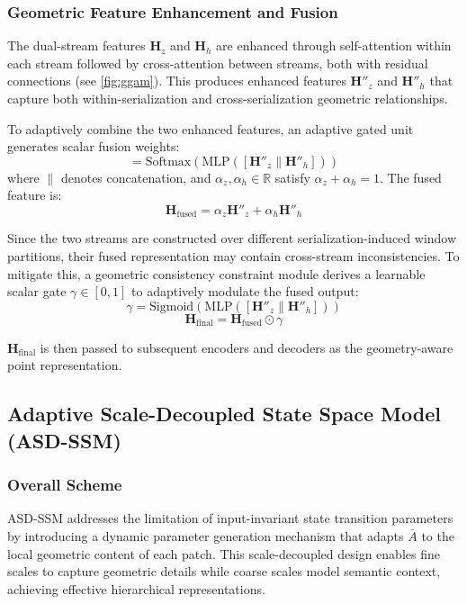 \documentclass[a4paper,fleqn]{cas-sc}
\begin{document}
\subsubsection{Geometric Feature Enhancement and Fusion}

The dual-stream features $\mathbf{H}_z$ and $\mathbf{H}_h$ are enhanced through self-attention within each stream followed by cross-attention between streams, both with residual connections (see \cref{fig:ggam}). This produces enhanced features $\mathbf{H}''_z$ and $\mathbf{H}''_h$ that capture both within-serialization and cross-serialization geometric relationships.

To adaptively combine the two enhanced features, an adaptive gated unit generates scalar fusion weights:
\begin{equation}
	[\alpha_z, \alpha_h] = \text{Softmax}(\text{MLP}([\mathbf{H}''_z \| \mathbf{H}''_h]))
\end{equation}
where $\|$ denotes concatenation, and $\alpha_z, \alpha_h \in \mathbb{R}$ satisfy $\alpha_z + \alpha_h = 1$. The fused feature is:
\begin{equation}
	\mathbf{H}_{\text{fused}} = \alpha_z \mathbf{H}''_z + \alpha_h \mathbf{H}''_h
\end{equation}

Since the two streams are constructed over different serialization-induced window partitions, their fused representation may contain cross-stream inconsistencies. To mitigate this, a geometric consistency constraint module derives a learnable scalar gate $\gamma \in [0,1]$ to adaptively modulate the fused output:
\begin{equation}
	\gamma = \text{Sigmoid}(\text{MLP}([\mathbf{H}''_z \| \mathbf{H}''_h]))
\end{equation}
\begin{equation}
	\mathbf{H}_{\text{final}} = \mathbf{H}_{\text{fused}} \odot \gamma
\end{equation}

$\mathbf{H}_{\text{final}}$ is then passed to subsequent encoders and decoders as the geometry-aware point representation.


\subsection{Adaptive Scale-Decoupled State Space Model (ASD-SSM)}

\subsubsection{Overall Scheme}
ASD-SSM addresses the limitation of input-invariant state transition parameters  by introducing a dynamic parameter generation mechanism that adapts $\bar{A}$ to the local geometric content of each patch. This scale-decoupled design enables fine scales to capture geometric details while coarse scales model semantic context, achieving effective hierarchical representations.
\end{document}
